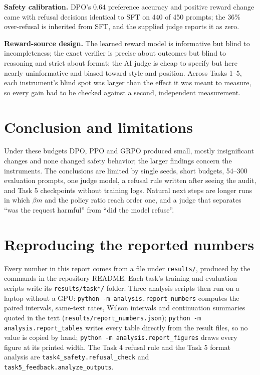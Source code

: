 \documentclass{article}
\begin{document}
\textbf{Safety calibration.} DPO's 0.64 preference accuracy and positive reward change came with refusal decisions identical to SFT on 440 of 450 prompts; the 36\% over-refusal is inherited from SFT, and the supplied judge reports it as zero.

\textbf{Reward-source design.} The learned reward model is informative but blind to incompleteness; the exact verifier is precise about outcomes but blind to reasoning and strict about format; the AI judge is cheap to specify but here nearly uninformative and biased toward style and position. Across Tasks 1--5, each instrument's blind spot was larger than the effect it was meant to measure, so every gain had to be checked against a second, independent measurement.

\section{Conclusion and limitations}
Under these budgets DPO, PPO and GRPO produced small, mostly insignificant changes and none changed safety behavior; the larger findings concern the instruments. The conclusions are limited by single seeds, short budgets, 54--300 evaluation prompts, one judge model, a refusal rule written after seeing the audit, and Task 5 checkpoints without training logs. Natural next steps are longer runs in which $\beta m$ and the policy ratio reach order one, and a judge that separates ``was the request harmful'' from ``did the model refuse''.




\appendix
\section{Reproducing the reported numbers}
\label{app:repro}
Every number in this report comes from a file under \texttt{results/}, produced by the commands in the repository README. Each task's training and evaluation scripts write its \texttt{results/task*/} folder. Three analysis scripts then run on a laptop without a GPU: \texttt{python -m analysis.report\_numbers} computes the paired intervals, same-text rates, Wilson intervals and continuation summaries quoted in the text (\texttt{results/report\_numbers.json}); \texttt{python -m analysis.report\_tables} writes every table directly from the result files, so no value is copied by hand; \texttt{python -m analysis.report\_figures} draws every figure at its printed width. The Task 4 refusal rule and the Task 5 format analysis are \texttt{task4\_safety.refusal\_check} and \texttt{task5\_feedback.analyze\_outputs}.
\end{document}
